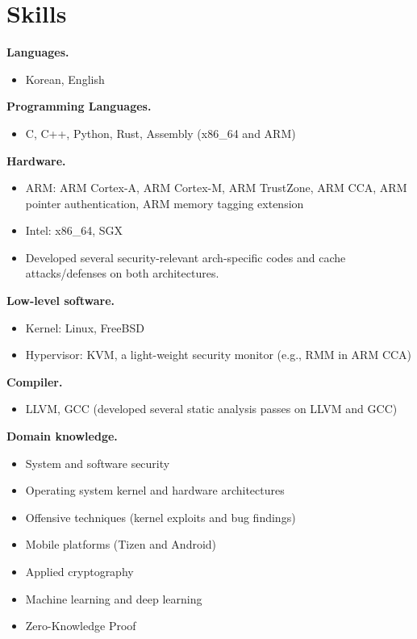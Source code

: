 \documentclass[10pt, a4paper]{article}
\begin{document}
\section{Skills}

\textbf{Languages.} 
\begin{itemize}
  \item Korean, English
\end{itemize}

\textbf{Programming Languages.}
\begin{itemize}
  \item C, C++, Python, Rust, Assembly (x86\_64 and ARM)
\end{itemize}

\textbf{Hardware.}
\begin{itemize}
  \item ARM: ARM Cortex-A, ARM Cortex-M, ARM TrustZone, ARM CCA, ARM pointer authentication, ARM memory tagging extension
  \item Intel: x86\_64, SGX
  \item Developed several security-relevant arch-specific codes and cache attacks/defenses on both architectures.
\end{itemize}

\textbf{Low-level software.}
\begin{itemize}
  \item Kernel: Linux, FreeBSD
  \item Hypervisor: KVM, a light-weight security monitor (e.g., RMM in ARM CCA)
\end{itemize}

\textbf{Compiler.}
\begin{itemize}
  \item LLVM, GCC (developed several static analysis passes on LLVM and GCC)
\end{itemize}

\textbf{Domain knowledge.}
\begin{itemize}
  \item System and software security 
  \item Operating system kernel and hardware architectures
  \item Offensive techniques (kernel exploits and bug findings)
  \item Mobile platforms (Tizen and Android)
  \item Applied cryptography
  \item Machine learning and deep learning
  \item Zero-Knowledge Proof
\end{itemize}

\end{document}
